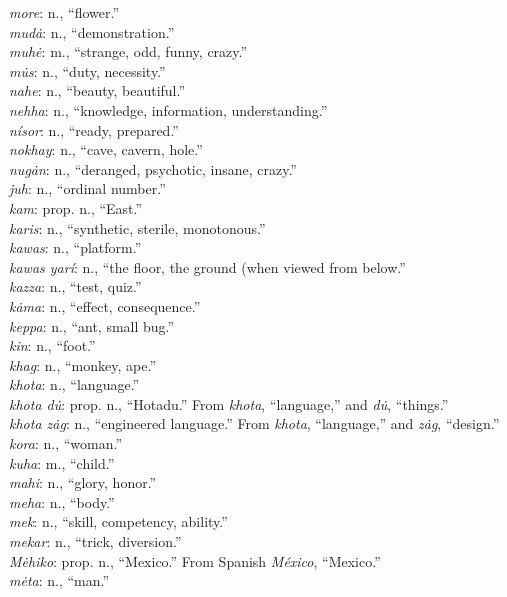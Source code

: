 \documentclass{article}[10pt]
\begin{document}
\begin{multicols}{3}
\emph{more}: n., ``flower.''\\
\emph{mud\.{a}}: n., ``demonstration.''\\
\emph{muh\.{e}}: m., ``strange, odd, funny, crazy.''\\
\emph{m\.{u}s}: n., ``duty, necessity.''\\
\emph{nahe}: n., ``beauty, beautiful.''\\
\emph{nehha}: n., ``knowledge, information, understanding.''\\
\emph{n\'{i}sor}: n., ``ready, prepared.''\\ 
\emph{nokhay}: n., ``cave, cavern, hole.''\\
\emph{nug\.{a}n}: n., ``deranged, psychotic, insane, crazy.''\\
\emph{juh}: n., ``ordinal number.''\\
\emph{kam}: prop. n., ``East.''\\
\emph{karis}: n., ``synthetic, sterile, monotonous.''\\
\emph{kawas}: n., ``platform.''\\
\emph{kawas yar\'{i}}: n., ``the floor, the ground (when viewed from below.''\\
\emph{kazza}: n., ``test, quiz.''\\
\emph{k\.{a}ma}: n., ``effect, consequence.''\\
\emph{keppa}: n., ``ant, small bug.''\\
\emph{kin}: n., ``foot.''\\
\emph{khag}: n., ``monkey, ape.''\\
\emph{khota}: n., ``language.''\\
\emph{khota d\.{u}}: prop. n., ``Hotadu.'' From \emph{khota}, ``language,'' and \emph{d\.{u}}, ``things.''\\
\emph{khota z\.{a}g}: n., ``engineered language.'' From \emph{khota}, ``language,'' and \emph{z\.{a}g}, ``design.''\\
\emph{kora}: n., ``woman.''\\
\emph{kuha}: m., ``child.''\\
\emph{mahi}: n., ``glory, honor.''\\
\emph{meha}: n., ``body.''\\
\emph{mek}: n., ``skill, competency, ability.''\\
\emph{mekar}: n., ``trick, diversion.''\\
\emph{M\.{e}hiko}: prop. n., ``Mexico.'' From Spanish \emph{M\'{e}xico}, ``Mexico.''\\
\emph{m\.{e}ta}: n., ``man.''\\

\end{multicols}
\end{document}
